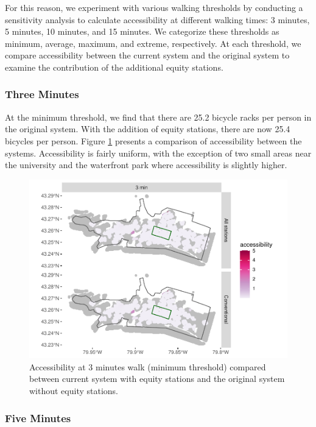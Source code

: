 \documentclass[]{elsarticle} %
\begin{document}
For this reason, we experiment with various walking thresholds by
conducting a sensitivity analysis to calculate accessibility at
different walking times: 3 minutes, 5 minutes, 10 minutes, and 15
minutes. We categorize these thresholds as minimum, average, maximum,
and extreme, respectively. At each threshold, we compare accessibility
between the current system and the original system to examine the
contribution of the additional equity stations.

\hypertarget{three-minutes}{%
\subsubsection{Three Minutes}\label{three-minutes}}

At the minimum threshold, we find that there are 25.2 bicycle racks per
person in the original system. With the addition of equity stations,
there are now 25.4 bicycles per person. Figure \ref{fig:figure-6}
presents a comparison of accessibility between the systems.
Accessibility is fairly uniform, with the exception of two small areas
near the university and the waterfront park where accessibility is
slightly higher.

\begin{figure}

{\centering \includegraphics[width=0.65\linewidth]{Bike-share-spatial-equity_files/figure-latex/figure-6-1} 

}

\caption{Accessibility at 3 minutes walk (minimum threshold) compared between current system with equity stations and the original system without equity stations.}\label{fig:figure-6}
\end{figure}

\hypertarget{five-minutes}{%
\subsubsection{Five Minutes}\label{five-minutes}}
\end{document}
